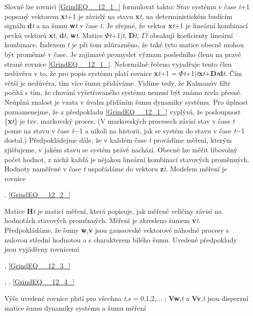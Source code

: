 \noindent Slovně lze rovnici \eqref{GrindEQ__12_1_} formulovat takto: Stav systému v čase \textit{t}+1 popsaný vektorem \textbf{x}\textit{t}+1 je závislý na stavu \textbf{x}\textit{t}, na deterministickém budícím signálu \textbf{d}\textit{t} a na šumu \textbf{w}\textit{t} v čase \textit{t}. Je zřejmé, že vektor \textbf{x}\textit{t}+1 je lineární kombinací prvků vektorů \textbf{x}\textit{t}, \textbf{d}\textit{t}, \textbf{w}\textit{t}. Matice \textbf{$\Phi$}\textit{t}+1$\mid$\textit{t}, \textbf{D}\textit{t}, \textbf{$\Gamma$}\textit{t} obsahují koeficienty lineární kombinace. Indexem \textit{t} je při tom zdůrazněno, že také tyto matice obecně mohou být proměnné v čase. Je zajímavé promyslet význam posledního členu na pravé straně rovnice \eqref{GrindEQ__12_1_}. Neformálně řečeno vyjadřuje tento člen nedůvěru v to, že pro popis systému platí rovnice \textbf{x}\textit{t}+1 = \textbf{$\Phi$}\textit{t}+1$\mid$\textit{t}\textbf{x}\textit{t}+\textbf{D}\textit{t}\textbf{d}\textit{t}. Čím větší je nedůvěra, tím více šumu přidáváme. Vidíme tedy, že Kalmanův filtr počítá s tím, že chování vyšetřovaného systému nemusí být známo zcela přesně. Neúplná znalost je vzata v úvahu přidáním šumu dynamiky systému. Pro úplnost poznamenejme, že z předpokladu \eqref{GrindEQ__12_1_} vyplývá, že posloupnost \{\textbf{x}\textit{t}\} je tzv. markovský proces. (V markovských procesech závisí stav v čase \textit{t} pouze na stavu v čase \textit{t}$-$1 a nikoli na historii, jak se systém do stavu v čase \textit{t}$-$1 dostal.) Předpokládejme dále, že v každém čase \textit{t} provádíme měření, kterým zjišťujeme, v jakém stavu se systém právě nachází. Obecně lze měřit libovolný počet hodnot, z nichž každá je nějakou lineární kombinací stavových proměnných. Hodnoty naměřené v čase \textit{t} uspořádáme do vektoru \textbf{z}\textit{t}. Modelem měření je rovnice  

 . \eqref{GrindEQ__12_2_}

\noindent Matice \textbf{H}\textit{t} je maticí měření, která popisuje, jak měřené veličiny závisí na hodnotách stavových proměnných. Měření je zkresleno šumem \textbf{v}\textit{t}. Předpokládáme, že šumy \textbf{w},\textbf{v} jsou gaussovské vektorové náhodné procesy s nulovou střední hodnotou a s charakterem bílého šumu. Uvedené předpoklady jsou vyjádřeny rovnicemi 

 , \eqref{GrindEQ__12_3_}

 ,     . \eqref{GrindEQ__12_4_}

\noindent Výše uvedené rovnice platí pro všechna \textit{t},\textit{s} = 0,1,2,... ; \textbf{Vw},\textit{t} a \textbf{Vv},\textit{t} jsou disperzní matice šumu dynamiky systému a šumu měření

